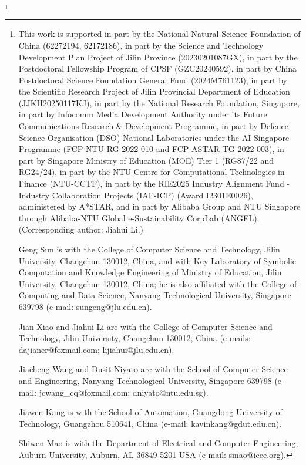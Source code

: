 \documentclass[10pt,journal,compsoc]{IEEEtran}
\begin{document}
{\thanks{This work is supported in part by the National Natural Science Foundation of China (62272194, 62172186), in part by the Science and Technology Development Plan Project of Jilin Province (20230201087GX), in part by the Postdoctoral Fellowship Program of CPSF (GZC20240592), in part by China Postdoctoral Science Foundation General Fund (2024M761123), in part by the Scientific Research Project of Jilin Provincial Department of Education (JJKH20250117KJ), in part by the National Research Foundation, Singapore, in part by Infocomm Media Development Authority under its Future Communications Research \& Development Programme, in part by Defence Science Organisation (DSO) National Laboratories under the AI Singapore Programme (FCP-NTU-RG-2022-010 and FCP-ASTAR-TG-2022-003), in part by Singapore Ministry of Education (MOE) Tier 1 (RG87/22 and RG24/24), in part by the NTU Centre for Computational Technologies in Finance (NTU-CCTF), in part by the RIE2025 Industry Alignment Fund - Industry Collaboration Projects (IAF-ICP) (Award I2301E0026), administered by A*STAR, and in part by Alibaba Group and NTU Singapore through Alibaba-NTU Global e-Sustainability CorpLab (ANGEL). (Corresponding author: Jiahui Li.)
\par Geng Sun is with the College of Computer Science and Technology, Jilin University, Changchun 130012, China, and with Key Laboratory of Symbolic Computation and Knowledge Engineering of Ministry of Education, Jilin University, Changchun 130012, China; he is also affiliated with the College of Computing and Data Science, Nanyang Technological University, Singapore 639798 (e-mail: sungeng@jlu.edu.cn).
\par Jian Xiao and Jiahui Li are with the College of Computer Science and Technology, Jilin University, Changchun 130012, China (e-mails: dajianer@foxmail.com; lijiahui@jlu.edu.cn).
\par Jiacheng Wang and Dusit Niyato are with the School of Computer Science and Engineering, Nanyang Technological University, Singapore 639798 (e-mail: jcwang\_cq@foxmail.com; dniyato@ntu.edu.sg).
\par Jiawen Kang is with the School of Automation, Guangdong University of Technology, Guangzhou 510641, China (e-mail: kavinkang@gdut.edu.cn).
\par Shiwen Mao is with the Department of Electrical and Computer Engineering, Auburn University, Auburn, AL 36849-5201 USA (e-mail: smao@ieee.org).
}
}
\end{document}
